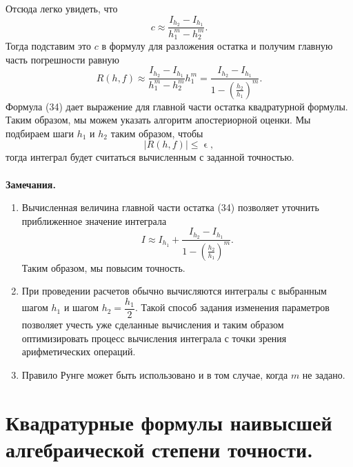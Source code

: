 \documentclass[a4paper, 12pt]{report}
\numberwithin{equation}{section}
\renewcommand{\leq}{\leqslant}
\renewcommand{\varepsilon}{\upvarepsilon}
\begin{document}
	 Отсюда легко увидеть, что $$c\approx \dfrac{I_{h_2} - I_{h_1}}{h_1^m - h_2^m}.$$
	 Тогда подставим это $c$ в формулу для разложения остатка и получим главную часть погрешности равную \begin{equation}
	 	R(h,f)\approx \dfrac{I_{h_2}-I_{h_1}}{h_1^m - h_2^m}h_1^m = \dfrac{I_{h_2}-I_{h_1}}{1 - \left(\frac{h_2}{h_1}\right)^m}.
	 \end{equation}
	 Формула (34) дает выражение для главной части остатка квадратурной формулы. Таким образом, мы можем указать алгоритм апостериорной оценки. Мы подбираем шаги $h_1$ и $h_2$ таким образом, чтобы $$|R(h,f)|\leq \varepsilon,$$ тогда интеграл будет считаться вычисленным с заданной точностью.\\\\
	 \textbf{Замечания.}
	 \begin{enumerate}
	 	\item Вычисленная величина главной части остатка (34) позволяет уточнить приближенное значение интеграла \begin{equation}
	 		I\approx I_{h_1} + \dfrac{I_{h_2}-I_{h_1}}{1 - \left(\frac{h_2}{h_1}\right)^m}.
	 	\end{equation}
	 	Таким образом, мы повысим точность.
	 	\item При проведении расчетов обычно вычисляются интегралы с выбранным шагом $h_1$ и шагом $h_2 = \dfrac{h_1}2$. Такой способ задания изменения параметров позволяет учесть уже сделанные вычисления и таким образом оптимизировать процесс вычисления интеграла с точки зрения арифметических операций.
	 	\item Правило Рунге может быть использовано и в том случае, когда $m$ не задано.
	 \end{enumerate}
	 \section{Квадратурные формулы наивысшей алгебраической степени точности.}
\end{document}
